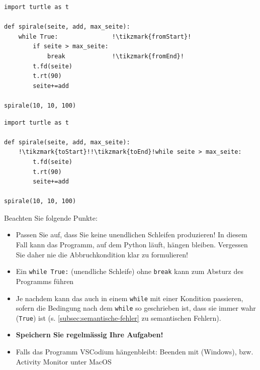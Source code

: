 \begin{minipage}{.45\textwidth}
\begin{lstlisting}[escapechar=!]
import turtle as t

def spirale(seite, add, max_seite):
    while True:               !\tikzmark{fromStart}!
    	if seite > max_seite:
    	    break             !\tikzmark{fromEnd}!
        t.fd(seite)
        t.rt(90)
        seite+=add

spirale(10, 10, 100)
\end{lstlisting}
\end{minipage}
\begin{minipage}{.45\textwidth}
\begin{lstlisting}[escapechar=!]
import turtle as t

def spirale(seite, add, max_seite):
    !\tikzmark{toStart}!!\tikzmark{toEnd}!while seite > max_seite:
        t.fd(seite)
        t.rt(90)
        seite+=add
        
spirale(10, 10, 100)
\end{lstlisting}
\end{minipage}


\begin{myattention}
Beachten Sie folgende Punkte:
\begin{itemize}
\item Passen Sie auf, dass Sie keine unendlichen Schleifen produzieren! In diesem Fall kann das Programm, auf dem Python läuft, hängen bleiben. Vergessen Sie daher nie die Abbruchkondition klar zu formulieren!
\item Ein \lstinline|while True:| (unendliche Schleife) ohne \lstinline|break| kann zum Absturz des Programms führen 
\item Je nachdem kann das auch in einem \lstinline|while| mit einer Kondition passieren, sofern die Bedingung nach dem \lstinline|while| so geschrieben ist, dass sie immer wahr (\lstinline|True|) ist (s. \cref{subsec:semantische-fehler} zu semantischen Fehlern).
\item \textbf{Speichern Sie regelmässig Ihre Aufgaben!}
\item Falls das Programm VSCodium hängenbleibt: Beenden mit  (Windows), bzw. Activity Monitor unter MacOS
\end{itemize}
\end{myattention}


